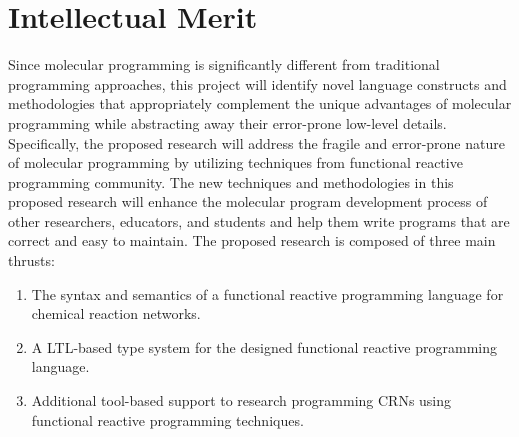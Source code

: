 







\section{Intellectual Merit}
Since molecular programming is significantly different from traditional programming approaches, this project will identify novel language constructs and methodologies that appropriately complement the unique advantages of molecular programming while abstracting away their error-prone low-level details.
Specifically, the proposed research will address the fragile and error-prone nature of molecular programming by utilizing techniques from functional reactive programming community.
The new techniques and methodologies in this proposed research will enhance the molecular program development process of other researchers, educators, and students and help them write programs that are correct and easy to maintain.  The proposed research is composed of three main thrusts:
\begin{enumerate}
	\item The syntax and semantics of a functional reactive programming language for chemical reaction networks.
	\item A LTL-based type system for the designed functional reactive programming language.
	\item Additional tool-based support to research programming CRNs using functional reactive programming techniques.
\end{enumerate}
